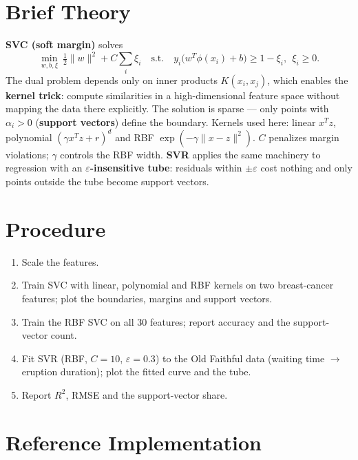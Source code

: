 \section{Brief Theory}
\textbf{SVC (soft margin)} solves
\[
\min_{w,b,\xi}\ \tfrac{1}{2}\lVert w\rVert^2 + C\sum_i \xi_i
\quad\text{s.t.}\quad y_i\bigl(w^T\phi(x_i)+b\bigr) \ge 1-\xi_i,\ \ \xi_i \ge 0 .
\]
The dual problem depends only on inner products $K(x_i, x_j)$, which enables the
\textbf{kernel trick}: compute similarities in a high-dimensional feature space without mapping
the data there explicitly. The solution is sparse --- only points with $\alpha_i > 0$
(\textbf{support vectors}) define the boundary. Kernels used here: linear $x^Tz$, polynomial
$(\gamma x^Tz + r)^d$ and RBF $\exp(-\gamma\lVert x-z\rVert^2)$. $C$ penalizes margin
violations; $\gamma$ controls the RBF width. \textbf{SVR} applies the same machinery to
regression with an \textbf{$\varepsilon$-insensitive tube}: residuals within $\pm\varepsilon$
cost nothing and only points outside the tube become support vectors.

\section{Procedure}
\begin{enumerate}
  \item Scale the features.
  \item Train SVC with linear, polynomial and RBF kernels on two breast-cancer features; plot
        the boundaries, margins and support vectors.
  \item Train the RBF SVC on all 30 features; report accuracy and the support-vector count.
  \item Fit SVR (RBF, $C = 10$, $\varepsilon = 0.3$) to the Old Faithful data (waiting time
        $\rightarrow$ eruption duration); plot the fitted curve and the tube.
  \item Report $R^2$, RMSE and the support-vector share.
\end{enumerate}

\section{Reference Implementation}


